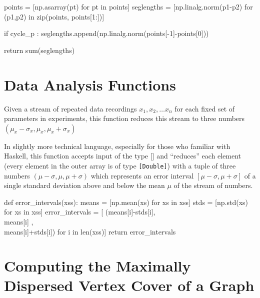      points     = [np.asarray(pt) for pt in points]
     seglengths = [np.linalg.norm(p1-p2) for (p1,p2) in zip(points, points[1:])]

     if cycle_p :
          seglengths.append(np.linalg.norm(points[-1]-points[0]))

     return sum(seglengths)
\nwendcode{}    



\section{Data Analysis Functions}
Given a stream of repeated data recordings $x_1, x_2, \ldots x_n$ for each fixed set of parameters
in experiments, this function reduces this stream to three numbers $(\mu_x-\sigma_x, \mu_x, \mu_x+\sigma_x)$

In slightly more technical language, especially for those who familiar with Haskell, 
this function accepts input of the type [\!] and ``reduces'' each 
element (every element in the outer array is of type \texttt{[Double]})
with a tuple of three numbers $(\mu-\sigma, \mu, \mu+\sigma)$ which represents an 
error interval $[\mu-\sigma, \mu + \sigma]$ of a single standard deviation above and
below the mean $\mu$ of the stream of numbers. 

\nwenddocs{}\plusendmoddef\nwstartdeflinemarkup{}\nwenddeflinemarkup
def error_intervals(xss):
     means           = [np.mean(xs) for xs in xss]
     stds            = [np.std(xs)  for xs in xss]
     error_intervals =  [ (means[i]-stds[i], \\
                           means[i]        , \\
                           means[i]+stds[i])   for i in len(xss)]
     return error_intervals
\nwendcode{}\nwdocspar


\section{Computing the Maximally Dispersed Vertex Cover of a Graph}

